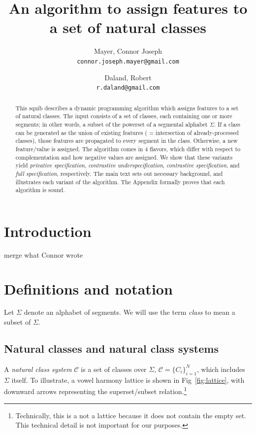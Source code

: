 \documentclass[11pt, oneside]{article}   	%
\title{An algorithm to assign features to a set of natural classes}
\author{}
\author{
  Mayer, Connor Joseph \\
  \texttt{connor.joseph.mayer@gmail.com}
  \and
  Daland, Robert \\
  \texttt{r.daland@gmail.com}
}
\begin{document}
\maketitle

\begin{abstract}
This squib describes a dynamic programming algorithm which assigns features to a set of natural classes. The input consists of a set of classes, each containing one or more segments; in other words, a subset of the powerset of a segmental alphabet $\Sigma$. If a class can be generated as the union of existing features ( = intersection of already-processed classes), those features are propagated to every segment in the class. Otherwise, a new feature/value is assigned. The algorithm comes in 4 flavors, which differ with respect to complementation and how negative values are assigned. We show that these variants yield \textit{privative specification}, \textit{contrastive underspecification}, \textit{contrastive specification}, and \textit{full specification}, respectively. The main text sets out necessary background, and illustrates each variant of the algorithm. The Appendix formally proves that each algorithm is sound.
\end{abstract}

\section{Introduction}
merge what Connor wrote

\section{Definitions and notation}

Let $\Sigma$ denote an alphabet of segments. We will use the term \textit{class} to mean a subset of $\Sigma$.  

\subsection{Natural classes and natural class systems}

A \textit{natural class system} $\mathcal C$ is a set of classes over $\Sigma$, $\mathcal C = \{C_i\}_{i=1}^N$, which includes $\Sigma$ itself. To illustrate, a vowel harmony lattice is shown in Fig~\ref{fig:lattice}, with downward arrows representing the superset/subset relation.\footnote{Technically, this is a not a lattice because it does not contain the empty set. This technical detail is not important for our purposes.}
\end{document}
